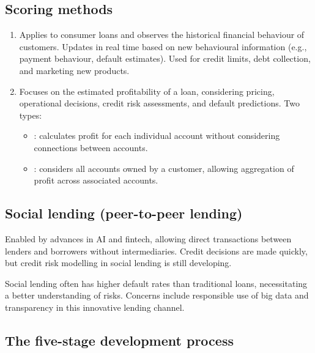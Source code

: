 \subsection*{Scoring methods}

\begin{enumerate}
\item {} Applies to consumer loans and observes the
historical financial behaviour of customers. Updates in real time based on new
behavioural information (e.g., payment behaviour, default estimates). Used for
credit limits, debt collection, and marketing new products.
\item {} Focuses on the estimated profitability of a loan,
considering pricing, operational decisions, credit risk assessments, and default
predictions. Two types:
  \begin{itemize}
  \item {}: calculates profit for each individual account
  without considering connections between accounts.
  \item {}: considers all accounts owned by a customer,
  allowing aggregation of profit across associated accounts.
  \end{itemize}
\end{enumerate}

\subsection*{Social lending (peer-to-peer lending)}

Enabled by advances in AI and fintech, allowing direct transactions between
lenders and borrowers without intermediaries. Credit decisions are made quickly,
but credit risk modelling in social lending is still developing.

Social lending often has higher default rates than traditional loans,
necessitating a better understanding of risks. Concerns include responsible use of
big data and transparency in this innovative lending channel.

\subsection*{The five-stage development process}

